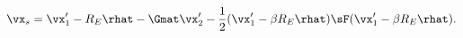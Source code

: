 \begin{equation}
\vx_s= \vx'_1 - R_E\rhat -  \Gmat\vx'_2 - \frac{1}{2}(\vx'_1 - \beta R_E\rhat) \sF (\vx'_1 - \beta R_E \rhat).
\label{eq:backgroundorder3}
\end{equation}